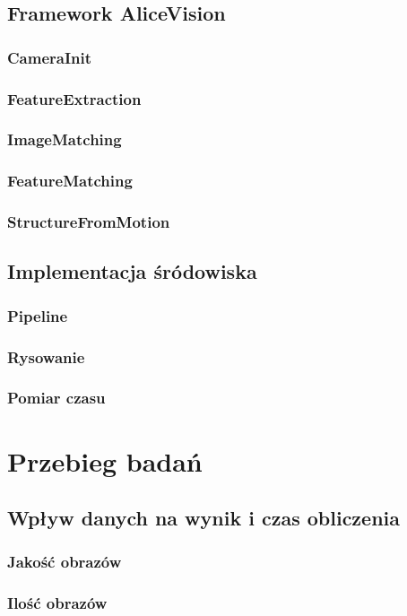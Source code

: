 \documentclass[eng,printmode]{mgr}
\begin{document}
\section{Framework AliceVision}
\subsection{CameraInit}
\subsection{FeatureExtraction}
\subsection{ImageMatching}
\subsection{FeatureMatching}
\subsection{StructureFromMotion}
\section{Implementacja śródowiska}
\subsection{Pipeline}
\subsection{Rysowanie}
\subsection{Pomiar czasu}

\chapter{Przebieg badań}
\section{Wpływ danych na wynik i czas obliczenia}
\subsection{Jakość obrazów}
\subsection{Ilość obrazów}
\end{document}
